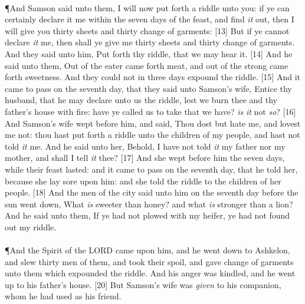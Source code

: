 \\
\P \textcolor[cmyk]{0.99998,1,0,0}{And Samson said unto them, I will now put forth a riddle unto you: if ye can certainly declare it me within the seven days of the feast, and find \emph{it} out, then I will give you thirty sheets and thirty change of garments:}
[13] \textcolor[cmyk]{0.99998,1,0,0}{But if ye cannot declare \emph{it} me, then shall ye give me thirty sheets and thirty change of garments. And they said unto him, Put forth thy riddle, that we may hear it.}
[14] \textcolor[cmyk]{0.99998,1,0,0}{And he said unto them, Out of the eater came forth meat, and out of the strong came forth sweetness. And they could not in three days expound the riddle.}
[15] \textcolor[cmyk]{0.99998,1,0,0}{And it came to pass on the seventh day, that they said unto Samson's wife, Entice thy husband, that he may declare unto us the riddle, lest we burn thee and thy father's house with fire: have ye called us to take that we have? \emph{is} \emph{it} not \emph{so}?}
[16] \textcolor[cmyk]{0.99998,1,0,0}{And Samson's wife wept before him, and said, Thou dost but hate me, and lovest me not: thou hast put forth a riddle unto the children of my people, and hast not told \emph{it} me. And he said unto her, Behold, I have not told \emph{it} my father nor my mother, and shall I tell \emph{it} thee?}
[17] \textcolor[cmyk]{0.99998,1,0,0}{And she wept before him the seven days, while their feast lasted: and it came to pass on the seventh day, that he told her, because she lay sore upon him: and she told the riddle to the children of her people.}
[18] \textcolor[cmyk]{0.99998,1,0,0}{And the men of the city said unto him on the seventh day before the sun went down, What \emph{is} sweeter than honey? and what \emph{is} stronger than a lion? And he said unto them, If ye had not plowed with my heifer, ye had not found out my riddle.}\\
\\
\P \textcolor[cmyk]{0.99998,1,0,0}{And the Spirit of the LORD came upon him, and he went down to Ashkelon, and slew thirty men of them, and took their spoil, and gave change of garments unto them which expounded the riddle. And his anger was kindled, and he went up to his father's house.}
[20] \textcolor[cmyk]{0.99998,1,0,0}{But Samson's wife was \emph{given} to his companion, whom he had used as his friend.}